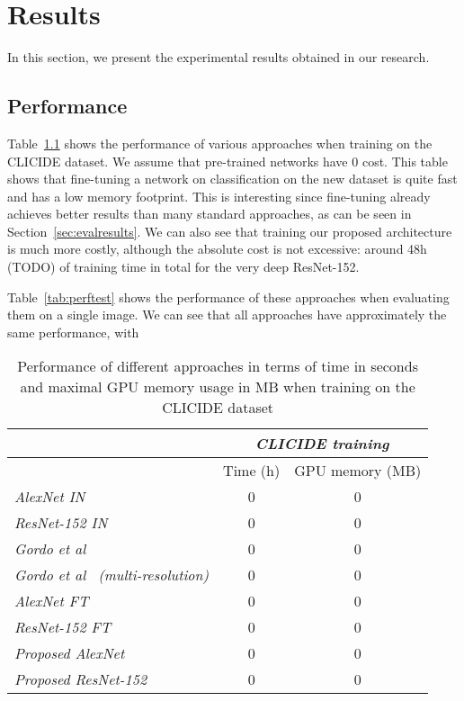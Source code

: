 
\chapter{Results}
In this section, we present the experimental results obtained in our
research.

\section{Performance}\label{sec:perfresults}
Table~\ref{tab:perftrain} shows the performance of various approaches
when training on the CLICIDE dataset. We assume that pre-trained
networks have 0 cost. This table shows that fine-tuning a network
on classification on the new dataset is quite fast and has a low memory
footprint. This is interesting since fine-tuning already achieves better
results than many standard approaches, as can be seen in
Section~\ref{sec:evalresults}.
We can also see that training our proposed architecture is much
more costly, although the absolute cost is not excessive:
around 48h (TODO) of training time in total for the very deep ResNet-152.

Table~\ref{tab:perftest} shows the performance of these approaches
when evaluating them on a single image. We can see that all approaches
have approximately the same performance, with %

\begin{table}
\begin{tabular}{|l|c|c|}
\hline & \multicolumn{2}{c|}{\emph{CLICIDE training}}\\
\hline & Time (h) & GPU memory (MB)\\
\hline \emph{AlexNet IN} & 0 & 0\\
\hline \emph{ResNet-152 IN} & 0 & 0\\
\hline \emph{Gordo et al~\cite{gordo_deep_2016}} & 0 & 0\\
\hline \emph{Gordo et al~\cite{gordo_deep_2016} (multi-resolution)}
& 0 & 0\\
\hline \emph{AlexNet FT} & 0 & 0\\ %
\hline \emph{ResNet-152 FT} & 0 & 0\\
\hline \emph{Proposed AlexNet} & 0 & 0\\ %
\hline \emph{Proposed ResNet-152} & 0 & 0\\
\hline
\end{tabular}
\caption{Performance of different approaches in terms of time in seconds and
maximal GPU memory usage in MB when training on the CLICIDE dataset
\label{tab:perftrain}}
\end{table}

